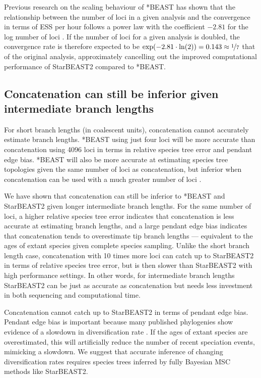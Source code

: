 \documentclass[nogrid]{MBE}%
\begin{document}
Previous research on the scaling behaviour of *BEAST has shown that the
relationship between the number of loci in a given analysis and the convergence
in terms of ESS per hour follows a power law with the coefficient $-2.81$ for
the log number of loci \citep{Ogilvie01052016}. If the number of loci for a
given analysis is doubled, the convergence rate is therefore
expected to be $\exp(-2.81 \cdot \ln(2)) = 0.143 \approx \nicefrac{1}{7}$ that
of the original analysis, approximately cancelling
out the improved computational performance of StarBEAST2 compared to *BEAST.

\subsection{Concatenation can still be inferior given intermediate branch lengths}

For short branch lengths (in coalescent units), concatenation cannot accurately
estimate branch lengths. *BEAST using just four loci will be more accurate than
concatenation using 4096 loci in terms in relative species tree error and
pendant edge bias. *BEAST will also be more accurate at estimating species tree
topologies given the same number of loci as concatenation, but inferior when
concatenation can be used with a much greater number of loci
\citep{Ogilvie01052016}.

We have shown that concatenation can still be inferior to *BEAST and StarBEAST2
given longer intermediate branch lengths. For the same number of loci, a higher
relative species tree error indicates that concatenation is less accurate at
estimating branch lengths, and a large pendant edge bias indicates that
concatenation tends to overestimate tip branch lengths --- equivalent to the
ages of extant species given complete species sampling. Unlike the short branch
length case, concatenation with 10 times more loci can catch up to StarBEAST2 in
terms of relative species tree error, but is then slower than StarBEAST2 with
high performance settings. In other words, for intermediate branch lengths
StarBEAST2 can be just as accurate as concatenation but needs less investment in
both sequencing and computational time.

Concatenation cannot catch up to StarBEAST2 in terms of pendant edge bias.
Pendant edge bias is important because many published phylogenies show evidence
of a slowdown in diversification rate \citep{Moen2014190}. If the ages of extant
species are overestimated, this will artificially reduce the number of recent
speciation events, mimicking a slowdown. We suggest that accurate inference of
changing diversification rates requires species trees inferred by fully Bayesian MSC methods
like StarBEAST2.
\end{document}
